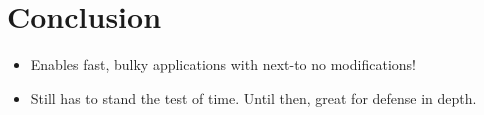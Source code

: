 \section{Conclusion}
\label{sec:conclusion}

\begin{itemize}
  \item Enables fast, bulky applications with next-to no modifications!
  \item Still has to stand the test of time.  Until then, great for defense in
    depth.
\end{itemize}
